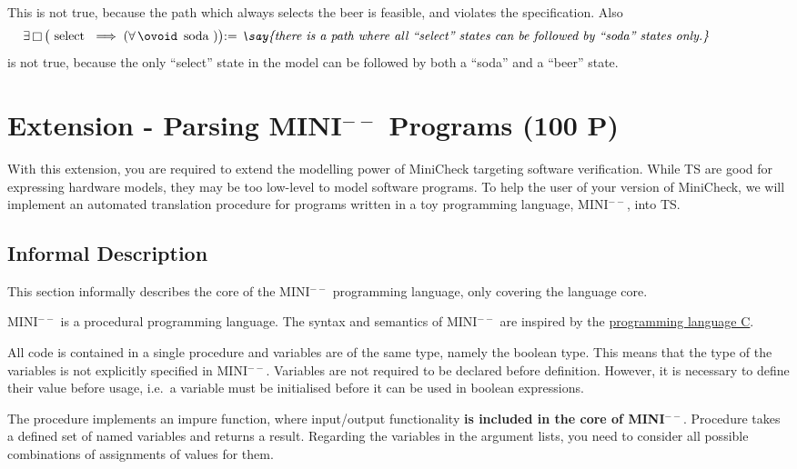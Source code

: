 \documentclass{article}
\newcommand{\saye}[1]{\emph{\say{#1}}}
\begin{document}
This is not true, because the path which always selects the beer is feasible, and violates the specification.
Also
\begin{alignat*}{3}
    \hspace*{-5em}\exists \llglob \big(\text{ select } \implies  (\forall \lnext \text{ soda })\big) & \text{:= \saye{there is a path where all ``select'' states can be followed by ``soda'' states only.}} \\ 
\end{alignat*}
is not true, because the only ``select'' state in the model can be followed by both a ``soda'' and 
a ``beer'' state.
\clearpage
\section{Extension - Parsing MINI$^{--}$ Programs (100 P)}
\label{sec:ext1}
With this extension, you are required to extend the modelling power of MiniCheck targeting 
software verification. While TS are good for expressing hardware models, they may be too low-level 
to model software programs. To help the user of your version of MiniCheck, we will implement an 
automated translation procedure for programs written in a toy programming language, MINI$^{--}$, into TS.

\subsection{Informal Description}
This section informally describes the core of the MINI$^{--}$ programming language, 
only covering the language core.

MINI$^{--}$ is a procedural programming language. 
The syntax and semantics of MINI$^{--}$ are inspired by the \href{https://en.wikipedia.org/wiki/C_(programming_language)}{programming language C}.

All code is contained in a single procedure  and variables are of the same type, 
namely the boolean type. This means that the type of the variables is not explicitly specified in MINI$^{--}$. 
Variables are not required to be declared before definition.
However, it is necessary to define their value before usage, 
i.e.~a variable must be initialised before it can be used in boolean expressions.

The procedure  implements an impure function, 
where input/output functionality \textbf{is  included in the core of MINI$^{--}$}. 
Procedure  takes a defined set of named variables and returns a result. 
Regarding the variables in the argument lists, 
you need to consider all possible combinations of assignments of values for them.
\end{document}
